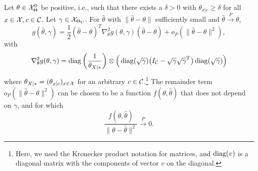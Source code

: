 \begin{Lem}\label{lem:g_derivatives_H0}
  Let $\theta \in \mathcal{X}_\Theta^0$ be positive, i.e., such that there exists a $\delta > 0$ with $\theta_{x|c} \ge \delta$ for all $x \in \mathcal{X}, c \in \mathcal{C}$.
  Let $\gamma \in \mathcal{X}_{\Theta_C}$.
  For $\hat\theta$ with $\lVert \hat\theta - \theta \rVert$ sufficiently small and $\hat\theta \stackrel{P}{\to} \theta$,
  \begin{equation}
    g(\hat\theta, \gamma) = \frac{1}{2} (\hat\theta - \theta)^T \nabla^2_\theta g(\theta,\gamma) (\hat\theta - \theta) + o_P(\lVert\hat\theta - \theta\rVert^2),
  \end{equation}
  with
  $$\nabla^2_{\theta} g(\theta,\gamma) 
    = \operatorname*{\mathrm{diag}}\bigg(\frac{1}{\theta_{X|\ast}}\bigg) \otimes \Big(\operatorname*{\mathrm{diag}}(\sqrt{\gamma}) \big(I_{\mathcal{C}} - \sqrt{\gamma} \sqrt{\gamma}^T\big)\operatorname*{\mathrm{diag}}(\sqrt{\gamma})\Big)$$
  where $\theta_{X|\ast} = (\theta_{x|c})_{x\in\mathcal{X}}$ for an arbitrary $c \in \mathcal{C}$.\footnote{Here, we used the Kronecker product notation for matrices, and $\operatorname*{\mathrm{diag}}(v)$ is a diagonal matrix with the components of vector $v$ on the diagonal.}
  The remainder term $o_P(\lVert\hat\theta - \theta\rVert^2)$ can be chosen to be a function $f(\theta,\hat\theta)$ that does not depend on $\gamma$, and for which
  $$\frac{f(\theta,\hat\theta)}{\lVert\theta - \hat\theta\rVert^2} \stackrel{P}{\to} 0.$$
\end{Lem}
